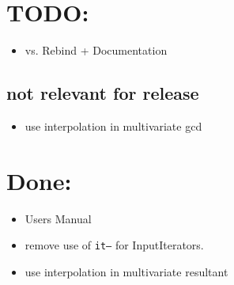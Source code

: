 \section{TODO:}
\begin{itemize}
\item {} vs. Rebind + Documentation
\end{itemize}

\subsection{not relevant for release}
\begin{itemize}
\item use interpolation in multivariate gcd 
\end{itemize}

\section{Done: }
\begin{itemize}
\item Users Manual
\item remove use of {\tt it--} for InputIterators. 
\item use interpolation in multivariate resultant
\end{itemize}